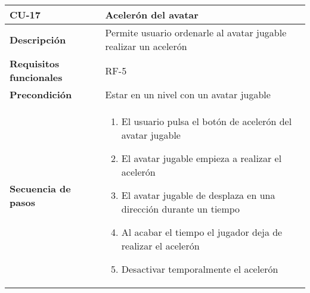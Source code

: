 \begin{longtable}{l|l}
\begin{minipage}{0.25\columnwidth}
\textbf{CU-17} 
\end{minipage}
&
\begin{minipage}{0.65\columnwidth}
Acelerón del avatar
\end{minipage}
\\ \hline

\begin{minipage}{0.25\columnwidth}
\textbf{Descripción} 
\end{minipage}
&
\begin{minipage}{0.65\columnwidth}
Permite usuario ordenarle al avatar jugable realizar un acelerón
\end{minipage}
\\ \hline

\begin{minipage}{0.25\columnwidth}
\textbf{Requisitos funcionales} 
\end{minipage}
&
\begin{minipage}{0.65\columnwidth}
RF-5
\end{minipage}
\\ \hline

\begin{minipage}{0.25\columnwidth}
\textbf{Precondición} 
\end{minipage}
&
\begin{minipage}{0.65\columnwidth}
Estar en un nivel con un avatar jugable
\end{minipage}
\\ \hline

\begin{minipage}{0.25\columnwidth}
\textbf{Secuencia de pasos} 
\end{minipage}
&
\begin{minipage}{0.65\columnwidth}
\begin{enumerate}
\item
El usuario pulsa el botón de acelerón del avatar jugable
\item
El avatar jugable empieza a realizar el acelerón
\item
El avatar jugable de desplaza en una dirección durante un tiempo
\item
Al acabar el tiempo el jugador deja de realizar el acelerón
\item
Desactivar temporalmente el acelerón
\end{enumerate}
\end{minipage}
\\ \hline


\end{longtable}
